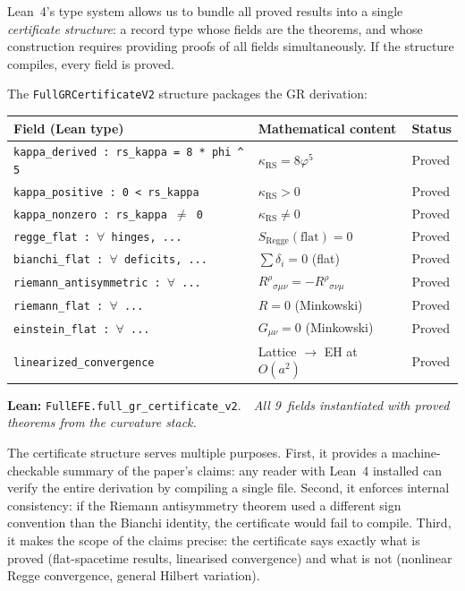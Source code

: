 \documentclass[11pt,a4paper]{article}
\newcommand{\vp}{\varphi}
\newcommand{\kRS}{\kappa_{\mathrm{RS}}}
\newcommand{\lean}[1]{\texttt{#1}}
\newcommand{\leanref}[2]{\noindent\textbf{Lean:} \lean{#1}.\ \ \textit{#2}}
\begin{document}
Lean~4's type system allows us to bundle all proved results into a single \emph{certificate structure}: a record type whose fields are the theorems, and whose construction requires providing proofs of all fields simultaneously.
If the structure compiles, every field is proved.

The \lean{FullGRCertificateV2} structure packages the GR derivation:

\begin{center}
\small
\begin{tabular}{p{5cm}p{4.5cm}l}
\toprule
\textbf{Field (Lean type)} & \textbf{Mathematical content} & \textbf{Status} \\
\midrule
\lean{kappa\_derived : rs\_kappa = 8 * phi \^{} 5} & $\kRS = 8\vp^5$ & Proved \\
\lean{kappa\_positive : 0 < rs\_kappa} & $\kRS > 0$ & Proved \\
\lean{kappa\_nonzero : rs\_kappa $\ne$ 0} & $\kRS \ne 0$ & Proved \\
\lean{regge\_flat : $\forall$ hinges, ...} & $S_{\mathrm{Regge}}(\text{flat}) = 0$ & Proved \\
\lean{bianchi\_flat : $\forall$ deficits, ...} & $\sum\delta_i = 0$ (flat) & Proved \\
\lean{riemann\_antisymmetric : $\forall$ ...} & $R^\rho{}_{\sigma\mu\nu} = -R^\rho{}_{\sigma\nu\mu}$ & Proved \\
\lean{riemann\_flat : $\forall$ ...} & $R = 0$ (Minkowski) & Proved \\
\lean{einstein\_flat : $\forall$ ...} & $G_{\mu\nu} = 0$ (Minkowski) & Proved \\
\lean{linearized\_convergence} & Lattice $\to$ EH at $O(a^2)$ & Proved \\
\bottomrule
\end{tabular}
\end{center}

\leanref{FullEFE.full\_gr\_certificate\_v2}{All 9~fields instantiated with proved theorems from the curvature stack.}

\noindent The certificate structure serves multiple purposes.
First, it provides a machine-checkable summary of the paper's claims: any reader with Lean~4 installed can verify the entire derivation by compiling a single file.
Second, it enforces internal consistency: if the Riemann antisymmetry theorem used a different sign convention than the Bianchi identity, the certificate would fail to compile.
Third, it makes the scope of the claims precise: the certificate says exactly what is proved (flat-spacetime results, linearised convergence) and what is not (nonlinear Regge convergence, general Hilbert variation).
\end{document}
